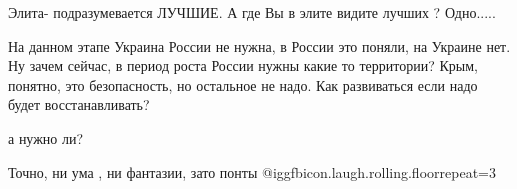 \begin{itemize}
Элита- подразумевается ЛУЧШИЕ. А где Вы в элите видите лучших ? Одно.....


На данном этапе Украина России не нужна, в России это поняли, на Украине нет.
Ну зачем сейчас, в период роста России нужны какие то территории? Крым,
понятно, это безопасность, но остальное не надо. Как развиваться если надо
будет восстанавливать?

а нужно ли?

Точно, ни ума , ни фантазии, зато понты @igg{fbicon.laugh.rolling.floor}{repeat=3} 

\end{itemize} %
